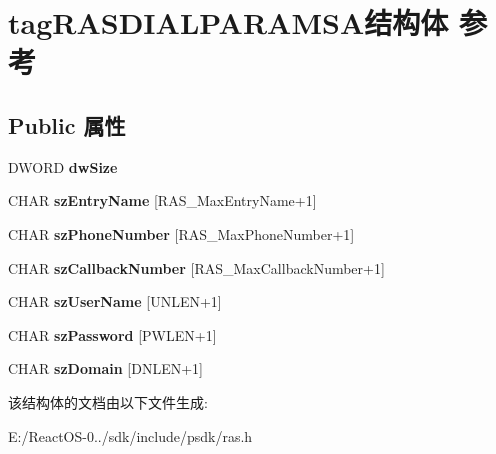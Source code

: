 \hypertarget{structtag_r_a_s_d_i_a_l_p_a_r_a_m_s_a}{}\section{tag\+R\+A\+S\+D\+I\+A\+L\+P\+A\+R\+A\+M\+S\+A结构体 参考}
\label{structtag_r_a_s_d_i_a_l_p_a_r_a_m_s_a}
\subsection*{Public 属性}
\begin{DoxyCompactItemize}
\item 
\mbox{\label{structtag_r_a_s_d_i_a_l_p_a_r_a_m_s_a_a3c53b53ed487b6c2c69717d891baa6f2}} 
D\+W\+O\+RD {\bfseries dw\+Size}
\item 
\mbox{\label{structtag_r_a_s_d_i_a_l_p_a_r_a_m_s_a_a49e3bb596c7b696424d4a270398ed231}} 
C\+H\+AR {\bfseries sz\+Entry\+Name} \mbox{[}R\+A\+S\+\_\+\+Max\+Entry\+Name+1\mbox{]}
\item 
\mbox{\label{structtag_r_a_s_d_i_a_l_p_a_r_a_m_s_a_a15884fe4fa2d47367a27c87a8abba657}} 
C\+H\+AR {\bfseries sz\+Phone\+Number} \mbox{[}R\+A\+S\+\_\+\+Max\+Phone\+Number+1\mbox{]}
\item 
\mbox{\label{structtag_r_a_s_d_i_a_l_p_a_r_a_m_s_a_af541c5d95827b9f4e1f5eb980a2b13c3}} 
C\+H\+AR {\bfseries sz\+Callback\+Number} \mbox{[}R\+A\+S\+\_\+\+Max\+Callback\+Number+1\mbox{]}
\item 
\mbox{\label{structtag_r_a_s_d_i_a_l_p_a_r_a_m_s_a_aa12f0483058fa3b6f8fa6fbf5593def0}} 
C\+H\+AR {\bfseries sz\+User\+Name} \mbox{[}U\+N\+L\+EN+1\mbox{]}
\item 
\mbox{\label{structtag_r_a_s_d_i_a_l_p_a_r_a_m_s_a_a2d9437cdc894348389dd4cb6794ece85}} 
C\+H\+AR {\bfseries sz\+Password} \mbox{[}P\+W\+L\+EN+1\mbox{]}
\item 
\mbox{\label{structtag_r_a_s_d_i_a_l_p_a_r_a_m_s_a_acf79d5e20ce05fa0626d0155f4ed6d3a}} 
C\+H\+AR {\bfseries sz\+Domain} \mbox{[}D\+N\+L\+EN+1\mbox{]}
\end{DoxyCompactItemize}


该结构体的文档由以下文件生成\+:\begin{DoxyCompactItemize}
\item 
E\+:/\+React\+O\+S-\/0../sdk/include/psdk/ras.\+h\end{DoxyCompactItemize}
